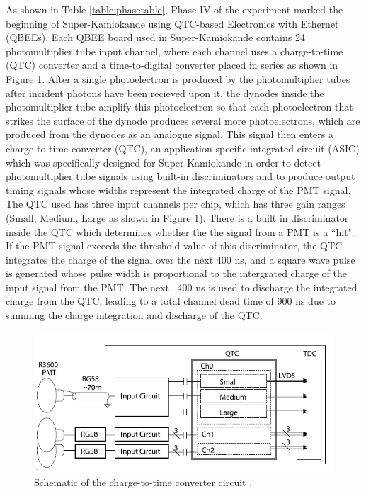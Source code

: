 As shown in Table \ref{table:phasetable}, Phase IV of the experiment marked the beginning of Super-Kamiokande using QTC-based Electronics with Ethernet (QBEEs). Each QBEE board used in Super-Kamiokande contains 24 photomultiplier tube input channel, where each channel uses a charge-to-time (QTC) converter and a time-to-digital converter placed in series as shown in Figure \ref{fig:superkdaq}. After a single photoelectron is produced by the photomultiplier tubes after incident photons have been recieved upon it, the dynodes inside the photomultiplier tube amplify this photoelectron so that each photoelectron that strikes the surface of the dynode produces several more photoelectrons, which are produced from the dynodes as an analogue signal. This signal then enters a charge-to-time converter (QTC), an application specific integrated circuit (ASIC) which was specifically designed for Super-Kamiokande in order to detect photomultiplier tube signals using built-in discriminators and to produce output timing signals whose widths represent the integrated charge of the PMT signal. The QTC used has three input channels per chip, which has three gain ranges (Small, Medium, Large as shown in Figure \ref{fig:superkdaq}). There is a built in discriminator inside the QTC which determines whether the the signal from a PMT is a ``hit". If the PMT signal exceeds the threshold value of this discriminator, the QTC integrates the charge of the signal over the next 400 ns, and a square wave pulse is generated whose pulse width is proportional to the intergrated charge of the input signal from the PMT. The next ~400 ns is used to discharge the integrated charge from the QTC, leading to a total channel dead time of 900 ns due to summing the charge integration and discharge of the QTC. 
\newline

\begin{figure}
    \includegraphics[width=\textwidth]{Figures/superk_daq.png}
\caption{Schematic of the charge-to-time converter circuit \cite{nishino_high-speed_2009}.}
    \label{fig:superkdaq}
\end{figure}

